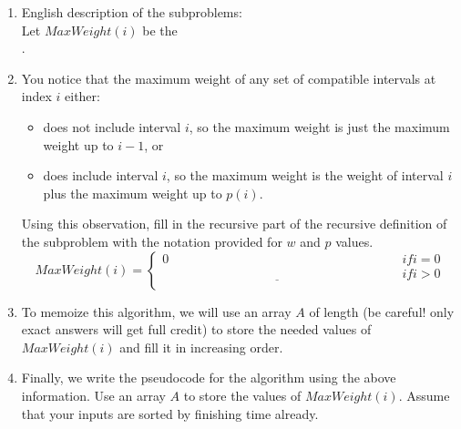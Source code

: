 \documentclass[11pt]{article}
\begin{document}
\begin{enumerate}
In order to give a dynamic programming solution to this problem, we follow the
four steps:

\item English description of the subproblems:
\\
Let $MaxWeight(i)$ be the \underline{\hspace{3.9in}}\\
\underline{\hspace{5.6in}}.

\item

You notice that the maximum weight of any set of compatible intervals 
at index $i$ either:
\begin{itemize}
    \item does not include interval $i$, so the maximum weight is just the maximum weight
    up to $i-1$, or
    \item does include interval $i$, so the maximum weight is the weight of interval $i$
    plus the maximum weight up to $p(i)$.
\end{itemize}

Using this observation, fill in the recursive part of the recursive definition
of the subproblem with the notation provided for $w$ and $p$ values.
    \begin{equation*}
        MaxWeight(i) =
        \begin{cases}
        0 & if i = 0 \\
        \underline{\hspace{3in}} & if i > 0 \\
        \end{cases}
    \end{equation*}

\item To memoize this algorithm, we will use an array $A$ of length
\underline{\hspace{1in}} (be careful! only exact answers will get full credit)
to store the needed values of $MaxWeight(i)$ and fill it in increasing order.

\item Finally, we write the pseudocode for the algorithm using the above information.
Use an array $A$ to store the values of $MaxWeight(i)$. Assume that your
inputs are sorted by finishing time already.



\end{enumerate}
\end{document}
